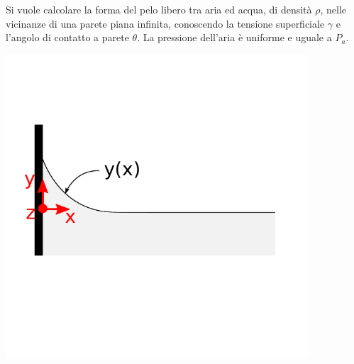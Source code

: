 \noindent
\begin{minipage}[b]{0.60\textwidth}
\begin{exerciseS}
Si vuole calcolare la forma del pelo libero tra aria ed acqua, di densità $\rho$, nelle vicinanze di una parete piana infinita, conoscendo la tensione superficiale $\gamma$ e l'angolo di contatto a parete $\theta$. La pressione dell'aria è uniforme e uguale a $P_a$.
\end{exerciseS}
\end{minipage}
\begin{minipage}[b]{0.39\textwidth}
 \begin{center}
  \includegraphics[width=0.85\textwidth, trim=0 80 0 50, clip]{./fig/freeSurfaceShape}
 \end{center}
\end{minipage}

\sol

\noindent
\partone

\noindent
\parttwo


